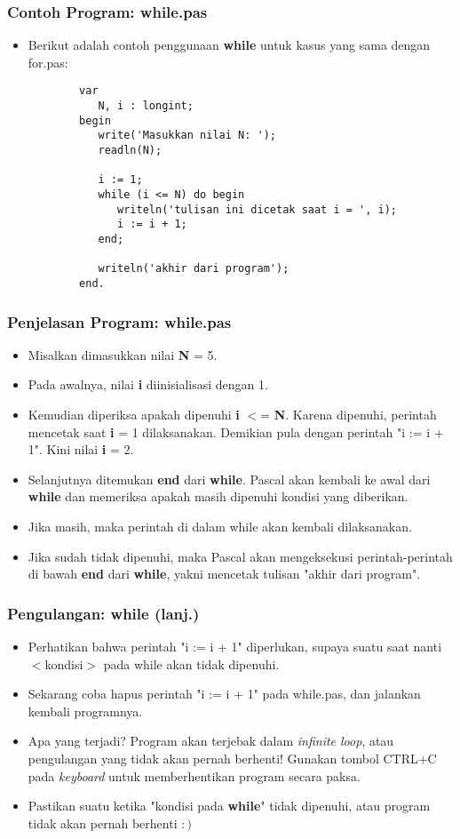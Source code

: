 \documentclass{beamer}
\begin{document}
\begin{frame}[fragile]
\frametitle{Contoh Program: while.pas}
\begin{itemize}
    \item Berikut adalah contoh penggunaan \textbf{while} untuk kasus yang sama dengan for.pas:
    \begin{lstlisting}
        var
           N, i : longint;
        begin
           write('Masukkan nilai N: ');
           readln(N);

           i := 1;
           while (i <= N) do begin
              writeln('tulisan ini dicetak saat i = ', i);
              i := i + 1;
           end;

           writeln('akhir dari program');
        end.
    \end{lstlisting}
\end{itemize}
\end{frame}

\begin{frame}
\frametitle{Penjelasan Program: while.pas}
\begin{itemize}
    \item Misalkan dimasukkan nilai \textbf{N} = 5.
    \item Pada awalnya, nilai \textbf{i} diinisialisasi dengan 1.
    \item Kemudian diperiksa apakah dipenuhi \textbf{i} $<$= \textbf{N}. Karena dipenuhi, perintah mencetak saat \textbf{i} = 1 dilaksanakan. Demikian pula dengan perintah "i := i + 1". Kini nilai \textbf{i} = 2.
    \item Selanjutnya ditemukan \textbf{end} dari \textbf{while}. Pascal akan kembali ke awal dari \textbf{while} dan memeriksa apakah masih dipenuhi kondisi yang diberikan.
    \item Jika masih, maka perintah di dalam while akan kembali dilaksanakan.
    \item Jika sudah tidak dipenuhi, maka Pascal akan mengeksekusi perintah-perintah di bawah \textbf{end} dari \textbf{while}, yakni mencetak tulisan "akhir dari program".
\end{itemize}
\end{frame}

\begin{frame}
\frametitle{Pengulangan: while (lanj.)}
\begin{itemize}
    \item Perhatikan bahwa perintah "i := i + 1" diperlukan, supaya suatu saat nanti $<$kondisi$>$ pada while akan tidak dipenuhi.
    \item Sekarang coba hapus perintah "i := i + 1" pada while.pas, dan jalankan kembali programnya.
    \item Apa yang terjadi? Program akan terjebak dalam \alert{\textit{infinite loop}}, atau \alert{pengulangan yang tidak akan pernah berhenti}! Gunakan tombol CTRL+C pada \textit{keyboard} untuk memberhentikan program secara paksa.
    \item Pastikan suatu ketika "kondisi pada \textbf{while}" tidak dipenuhi, atau program tidak akan pernah berhenti $:)$
\end{itemize}
\end{frame}
\end{document}
